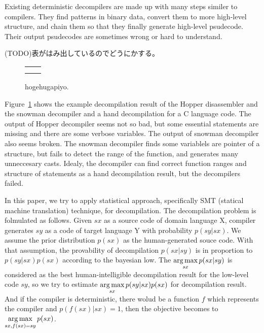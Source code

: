 \documentclass[senior,final,11pt]{iscs-thesis}
\newcommand{\argmax}{\mathop{\rm arg\,max}\limits}
\begin{document}
Existing deterministic decompilers are made up with many steps similer to compilers. 
They find patterns in binary data, convert them to more high-level structure, and chain them so that they finally generate high-level psudecode.
Their output psudecodes are sometimes wrong or hard to understand.



(TODO)表がはみ出しているのでどうにかする。

\begin{figure}
	\begin{tabular}{cc}
		\begin{minipage}[t]{0.5\hsize}
			
		\end{minipage}
		\begin{minipage}[t]{0.5\hsize}
			
		\end{minipage}
		\\
		\begin{minipage}[c]{0.5\hsize}
			
		\end{minipage}
		\begin{minipage}[c]{0.5\hsize}
			
		\end{minipage}
	\end{tabular}
	\caption{ hogehugapiyo.}
	\label{fig:cw}
\end{figure}


Figure~\ref{fig:cw} shows the example decompilation result of the Hopper disassembler and the snowman decompiler and a hand decompilation for a C language code.
The output of Hopper decompiler seems not so bad, but some essential statements are missing and there are some verbose variables.
The output of snowman decompiler also seems broken. 
The snowman decompiler finds some variablels are pointer of a structure, but fails to detect the range of the function, and generates many unneccesary casts.
Idealy, the decompiler can find correct function ranges and structure of statements as a hand decompilation result, but the decompilers failed.

In this paper, we try to apply statistical approach, specifically SMT (statical machine translation) technique, for decompilation.
The decompilation problem is folmulated as follows. 
Given $sx$ as a source code of domain language X, compiler generates $sy$ as a code of target language Y with probability $p(sy|sx)$. 
We assume the prior distribution $p(sx)$ as the human-generated souce code. 
With that assumption, the provability of decompilation $p(sx|sy)$ is in proportion to $p(sy|sx)p(sx)$ according to the bayesian low. 
The $\argmax_{sx} p(sx|sy)$ is considered as the best human-intelligible decompilation result for the low-level code $sy$,  
so we try to estimate $ \argmax_{sx} p(sy|sx)p(sx)$ for decompilation result.
And if the compiler is deterministic, there wolud be a function $f$ which represents the compiler and $p(f(sx)|sx) = 1$,
then the objective becomes to $ \argmax_{sx,f(sx)=sy} p(sx)$.
\end{document}
